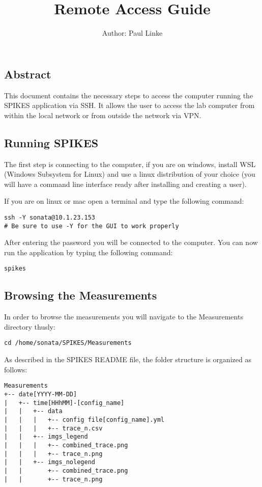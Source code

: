 \documentclass{article}
\date{}
\title{\Large{Remote Access Guide}}
\author{\normalsize{Author: Paul Linke}}
\begin{document}
\maketitle
\subsection*{Abstract}

This document contains the necessary steps to access the computer running the SPIKES application via SSH. It allows the user to access the lab computer from within the local network or from outside the network via VPN.

\subsection*{Running SPIKES}

The first step is connecting to the computer, if you are on windows, install WSL (Windows Subsystem for Linux) and use a linux distribution of your choice (you will have a command line interface ready after installing and creating a user). 

If you are on linux or mac open a terminal and type the following command:

\begin{lstlisting}
ssh -Y sonata@10.1.23.153
# Be sure to use -Y for the GUI to work properly
\end{lstlisting}

After entering the password you will be connected to the computer. You can now run the application by typing the following command:

\begin{lstlisting}
spikes
\end{lstlisting}


\subsection*{Browsing the Measurements}
In order to browse the measurements you will navigate to the Measurements directory thusly:

\begin{lstlisting}
cd /home/sonata/SPIKES/Measurements
\end{lstlisting}

As described in the SPIKES README file, the folder structure is organized as follows:

\begin{lstlisting}
Measurements
+-- date[YYYY-MM-DD]
|   +-- time[HHhMM]-[config_name]
|   |   +-- data
|   |   |   +-- config file[config_name].yml
|   |   |   +-- trace_n.csv
|   |   +-- imgs_legend
|   |   |   +-- combined_trace.png
|   |   |   +-- trace_n.png
|   |   +-- imgs_nolegend
|   |       +-- combined_trace.png
|   |       +-- trace_n.png
\end{lstlisting}
\end{document}
